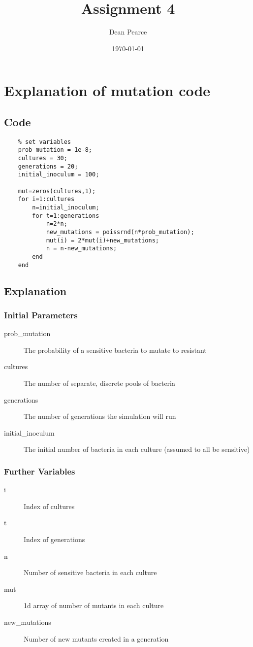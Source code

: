 \documentclass[titlepage]{scrartcl}
\title{Assignment 4}
\date{\today}
\author{Dean Pearce}
\begin{document}
\maketitle
\tableofcontents
\clearpage
\section{Explanation of mutation code}
\subsection{Code}
\begin{verbatim}
    % set variables
    prob_mutation = 1e-8;
    cultures = 30;
    generations = 20;
    initial_inoculum = 100;
    
    mut=zeros(cultures,1);
    for i=1:cultures
        n=initial_inoculum;
        for t=1:generations
            n=2*n;
            new_mutations = poissrnd(n*prob_mutation);
            mut(i) = 2*mut(i)+new_mutations;
            n = n-new_mutations;
        end
    end
\end{verbatim}
\subsection{Explanation}
\subsubsection{Initial Parameters}
\begin{description}
    \item[prob\_mutation] The probability of a sensitive bacteria to mutate to resistant
    \item[cultures] The number of separate, discrete pools of bacteria
    \item[generations] The number of generations the simulation will run
    \item[initial\_inoculum] The initial number of bacteria in each culture (assumed to all be sensitive)
\end{description}
\subsubsection{Further Variables}
\begin{description}
    \item[i] Index of cultures
    \item[t] Index of generations
    \item[n] Number of sensitive bacteria in each culture
    \item[mut] 1d array of number of mutants in each culture
    \item[new\_mutations] Number of new mutants created in a generation
\end{description}
\end{document}
